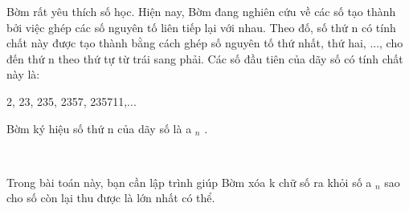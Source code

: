 Bờm rất yêu thích số học. Hiện nay, Bờm đang nghiên cứu về các số tạo thành bởi việc ghép các số nguyên tố liên tiếp lại với nhau. Theo đố, số thứ n có tính chất này được tạo thành bằng cách ghép số nguyên tố thứ nhất, thứ hai, ..., cho đến thứ n theo thứ tự từ trái sang phải. Các số đầu tiên của dãy số có tính chất này là:

2, 23, 235, 2357, 235711,...

Bờm ký hiệu số thứ n của dãy số là a $_ n $ .

 

Trong bài toán này, bạn cần lập trình giúp Bờm xóa k chữ số ra khỏi số a $_ n $ sao cho số còn lại thu được là lớn nhất có thể.